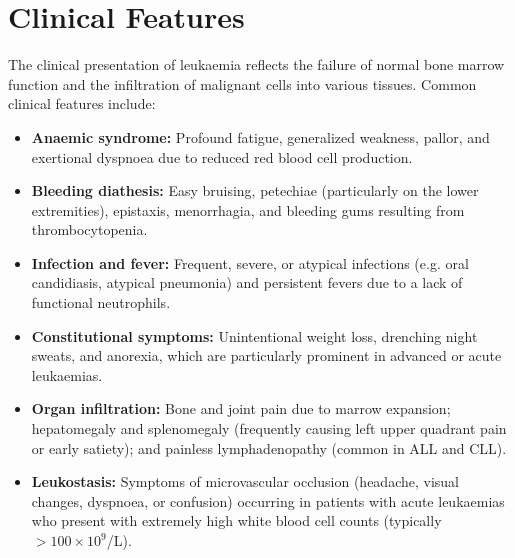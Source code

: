 \section*{Clinical Features}
The clinical presentation of leukaemia reflects the failure of normal bone marrow function and the infiltration of malignant cells into various tissues. Common clinical features include:
\begin{itemize}
    \item \textbf{Anaemic syndrome:} Profound fatigue, generalized weakness, pallor, and exertional dyspnoea due to reduced red blood cell production.
    \item \textbf{Bleeding diathesis:} Easy bruising, petechiae (particularly on the lower extremities), epistaxis, menorrhagia, and bleeding gums resulting from thrombocytopenia.
    \item \textbf{Infection and fever:} Frequent, severe, or atypical infections (e.g. oral candidiasis, atypical pneumonia) and persistent fevers due to a lack of functional neutrophils.
    \item \textbf{Constitutional symptoms:} Unintentional weight loss, drenching night sweats, and anorexia, which are particularly prominent in advanced or acute leukaemias.
    \item \textbf{Organ infiltration:} Bone and joint pain due to marrow expansion; hepatomegaly and splenomegaly (frequently causing left upper quadrant pain or early satiety); and painless lymphadenopathy (common in ALL and CLL).
    \item \textbf{Leukostasis:} Symptoms of microvascular occlusion (headache, visual changes, dyspnoea, or confusion) occurring in patients with acute leukaemias who present with extremely high white blood cell counts (typically $>100 \times 10^9$/L).
\end{itemize}

